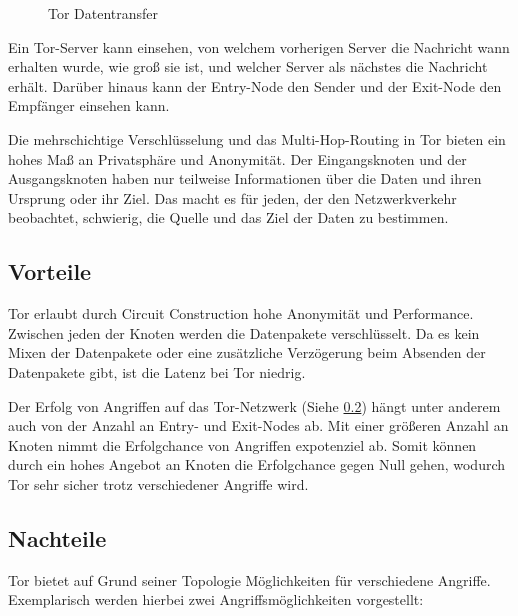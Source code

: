 \begin{figure}[h!]
    \centering
    
    \caption{Tor Datentransfer}
    \label{imgs:tor_transfer}
\end{figure}

Ein Tor-Server kann einsehen, von welchem vorherigen Server die Nachricht wann erhalten wurde, wie groß sie ist, und welcher Server als nächstes die Nachricht erhält. Darüber hinaus kann der Entry-Node den Sender und der Exit-Node den Empfänger einsehen kann.

Die mehrschichtige Verschlüsselung und das Multi-Hop-Routing in Tor bieten ein hohes Maß an Privatsphäre und Anonymität. Der Eingangsknoten und der Ausgangsknoten haben nur teilweise Informationen über die Daten und ihren Ursprung oder ihr Ziel. Das macht es für jeden, der den Netzwerkverkehr beobachtet, schwierig, die Quelle und das Ziel der Daten zu bestimmen\footnotemark{}.

\subsection{Vorteile}
\label{chap:tor_advantages}

Tor erlaubt durch Circuit Construction hohe Anonymität und Performance. Zwischen jeden der Knoten werden die Datenpakete verschlüsselt. Da es kein Mixen der Datenpakete oder eine zusätzliche Verzögerung beim Absenden der Datenpakete gibt, ist die Latenz bei Tor niedrig.

Der Erfolg von Angriffen auf das Tor-Netzwerk (Siehe \ref{chap:tor_disatvantages}) hängt unter anderem auch von der Anzahl an Entry- und Exit-Nodes ab. Mit einer größeren Anzahl an Knoten nimmt die Erfolgchance von Angriffen expotenziel ab. Somit können durch ein hohes Angebot an Knoten die Erfolgchance gegen Null gehen, wodurch Tor sehr sicher trotz verschiedener Angriffe wird.

\subsection{Nachteile}
\label{chap:tor_disatvantages}

Tor bietet auf Grund seiner Topologie Möglichkeiten für verschiedene Angriffe. Exemplarisch werden hierbei zwei Angriffsmöglichkeiten vorgestellt:

